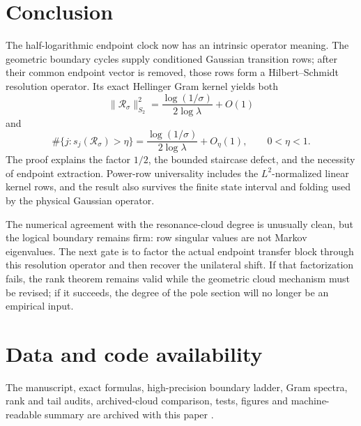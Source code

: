 \documentclass[11pt]{article}
\theoremstyle{definition}
\theoremstyle{remark}
\newcommand{\cR}{\mathcal R}
\begin{document}
\section{Conclusion}

The half-logarithmic endpoint clock now has an intrinsic operator meaning.
The geometric boundary cycles supply conditioned Gaussian transition rows;
after their common endpoint vector is removed, those rows form a
Hilbert--Schmidt resolution operator.  Its exact Hellinger Gram kernel yields
both
\[
 \|\cR_\sigma\|_{S_2}^2
 =\frac{\log(1/\sigma)}{2\log\lambda}+O(1)
\]
and
\[
 \#\{j:s_j(\cR_\sigma)>\eta\}
 =\frac{\log(1/\sigma)}{2\log\lambda}+O_\eta(1),
 \qquad 0<\eta<1.
\]
The proof explains the factor $1/2$, the bounded staircase defect, and the
necessity of endpoint extraction.  Power-row universality includes the
$L^2$-normalized linear kernel rows, and the result also survives the finite
state interval and folding used by the physical Gaussian operator.

The numerical agreement with the resonance-cloud degree is unusually clean,
but the logical boundary remains firm: row singular values are not Markov
eigenvalues.  The next gate is to factor the actual endpoint transfer block
through this resolution operator and then recover the unilateral shift.  If
that factorization fails, the rank theorem remains valid while the geometric
cloud mechanism must be revised; if it succeeds, the degree of the pole
section will no longer be an empirical input.

\section*{Data and code availability}

The manuscript, exact formulas, high-precision boundary ladder, Gram spectra,
rank and tail audits, archived-cloud comparison, tests, figures and
machine-readable summary are archived with this paper
\citep{WangEndpointRankCode2026}.



\end{document}
